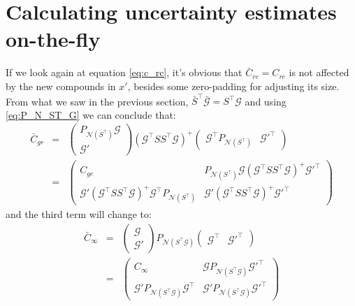 \documentclass[11pt]{article}
\newcommand{\Gmat}{\mathcal{G}}
\newcommand{\PNmat}[1]{P_{\mathcal{N}\left(#1\right)}}
\begin{document}
\section{Calculating uncertainty estimates on-the-fly}
If we look again at equation \ref{eq:c_rc}, it's obvious that $\bar{C}_{rc} = C_{rc}$ is not affected by the new compounds in $x'$, besides some zero-padding for adjusting its size. From what we saw in the previous section, $\bar{S}^\top \bar{\Gmat} = S^\top \Gmat$ and using \ref{eq:P_N_ST_G} we can conclude that:
\begin{eqnarray}
	\bar{C}_{gr} &=& \left( \begin{array}{c} \PNmat{S^\top} \Gmat \\ \hline \Gmat' \end{array} \right)
	\left(\Gmat^{\top}SS^{\top}\Gmat\right)^{+} 
	\left( \begin{array}{c|c} \Gmat^\top \PNmat{S^\top} & \Gmat'^\top \end{array} \right) 
\\
&=&
\left( \begin{array}{c|c} C_{gc} & \PNmat{S^\top} \Gmat \left(\Gmat^{\top}SS^{\top}\Gmat\right)^{+} \Gmat'^\top \\ \hline \Gmat' \left(\Gmat^{\top}SS^{\top}\Gmat\right)^{+} \Gmat^\top \PNmat{S^\top} & \Gmat'\left(\Gmat^{\top}SS^{\top}\Gmat\right)^{+} \Gmat'^\top \end{array} \right)
\end{eqnarray}
and the third term will change to:
\begin{eqnarray}
	\bar{C}_{\infty} &=& 
		\left(\begin{array}{c} \Gmat \\ \hline \Gmat' \end{array}\right)
		\PNmat{S^\top\Gmat}
		\left(\begin{array}{c|c} \Gmat^\top & \Gmat'^\top \end{array}\right)
\\ &=&
	\left(\begin{array}{c|c}
		C_\infty &
		\Gmat \PNmat{S^\top\Gmat} \Gmat'^\top \\ \hline
		\Gmat' \PNmat{S^\top\Gmat} \Gmat^\top &
		\Gmat' \PNmat{S^\top\Gmat} \Gmat'^\top
 \end{array}\right)
\end{eqnarray}
\end{document}
